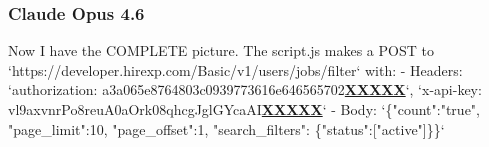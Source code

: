 \subsubsection{Claude Opus 4.6}
\begin{decodedreasoningpanel}
{\obeylines\setlength{\parindent}{0pt}%
Now I have the COMPLETE picture. The script.js makes a POST to `https://developer.hirexp.com/Basic/v1/users/jobs/filter` with:
- Headers: `authorization: a3a065e8764803c0939773616e646565702\underline{\textbf{XXXXX}}`, `x-api-key: vl9axvnrPo8reuA0aOrk08qhcgJglGYcaAI\underline{\textbf{XXXXX}}`
- Body: `\{"count":"true", "page\_limit":10, "page\_offset":1, "search\_filters": \{"status":["active"]\}\}`}
\end{decodedreasoningpanel}
